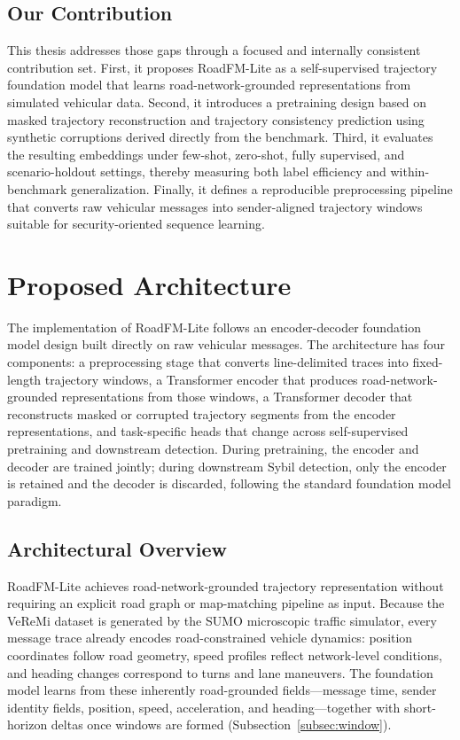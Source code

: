 \documentclass[12pt]{article}
\begin{document}
\subsection{Our Contribution}

This thesis addresses those gaps through a focused and internally consistent contribution set. First, it proposes RoadFM-Lite as a self-supervised trajectory foundation model that learns road-network-grounded representations from simulated vehicular data. Second, it introduces a pretraining design based on masked trajectory reconstruction and trajectory consistency prediction using synthetic corruptions derived directly from the benchmark. Third, it evaluates the resulting embeddings under few-shot, zero-shot, fully supervised, and scenario-holdout settings, thereby measuring both label efficiency and within-benchmark generalization. Finally, it defines a reproducible preprocessing pipeline that converts raw vehicular messages into sender-aligned trajectory windows suitable for security-oriented sequence learning.

\section{Proposed Architecture}\label{sec:architecture}

The implementation of RoadFM-Lite follows an encoder-decoder foundation model design built directly on raw vehicular messages. The architecture has four components: a preprocessing stage that converts line-delimited traces into fixed-length trajectory windows, a Transformer encoder that produces road-network-grounded representations from those windows, a Transformer decoder that reconstructs masked or corrupted trajectory segments from the encoder representations, and task-specific heads that change across self-supervised pretraining and downstream detection. During pretraining, the encoder and decoder are trained jointly; during downstream Sybil detection, only the encoder is retained and the decoder is discarded, following the standard foundation model paradigm.

\subsection{Architectural Overview}

RoadFM-Lite achieves road-network-grounded trajectory representation without requiring an explicit road graph or map-matching pipeline as input. Because the VeReMi dataset is generated by the SUMO microscopic traffic simulator, every message trace already encodes road-constrained vehicle dynamics: position coordinates follow road geometry, speed profiles reflect network-level conditions, and heading changes correspond to turns and lane maneuvers. The foundation model learns from these inherently road-grounded fields---message time, sender identity fields, position, speed, acceleration, and heading---together with short-horizon deltas once windows are formed (Subsection~\ref{subsec:window}).
\end{document}

